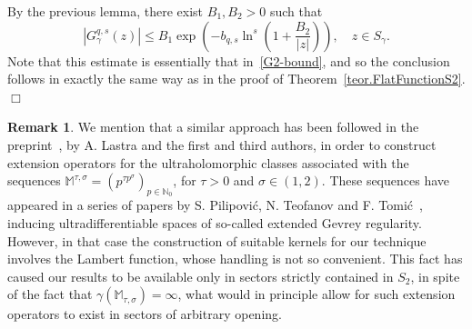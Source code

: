 \documentclass[11pt,a4paper]{article}
\theoremstyle{plain}
\theoremstyle{definition}
\newtheorem{rema}[theo]{Remark}
\newenvironment{proof1}{\medskip\par\noindent{\bf Proof.}}{\hfill $\Box$
\medskip\par}
\newcommand{\N}{\mathbb{N}}
\newcommand{\C}{\mathbb{C}}
\newcommand{\M}{\mathbb{M}}
\def\ga{\gamma}
\def\Ms{{\mathbb{M}}_{q,\sigma}}
\begin{document}
\begin{proof1}
By the previous lemma, there exist $B_1,B_2>0$ such that
\begin{equation*}
|G_{\ga}^{q,s}(z)|\leq B_1 \exp\left(-b_{q,s}\ln^s\left(1+\frac{B_2}{|z|}\right)\right),\quad  z\in S_\ga.
\end{equation*}
Note that this estimate is essentially that in~\eqref{G2-bound}, and so the conclusion follows in exactly the same way as in the proof of Theorem~\ref{teor.FlatFunctionS2}.
\end{proof1}

\begin{rema}
We mention that a similar approach has been followed in the preprint~\cite{JimenezLastraSanzRapidGrowth}, by A. Lastra and the first and third authors, in order to construct extension operators for the ultraholomorphic classes associated with the sequences $\M^{\tau,\sigma}=(p^{\tau p^{\sigma}})_{p\in\N_0}$, for $\tau>0$ and $\sigma\in(1,2)$. These sequences have appeared in a series of papers by S. Pilipovi{\'c}, N. Teofanov and F. Tomi{\'c}~\cite{ptt15,ptt16,ptt,ptt21}, inducing ultradifferentiable spaces of so-called extended Gevrey regularity. However, in that case the construction of suitable kernels for our technique involves the Lambert function, whose handling is not so convenient. This fact has caused our results to be available only in sectors strictly contained in $S_2$, in spite of the fact that $\ga(\M_{\tau,\sigma})=\infty$, what would in principle allow for such extension operators to exist in sectors of arbitrary opening.
\end{rema}
%
%
%
%
%
\end{document}

